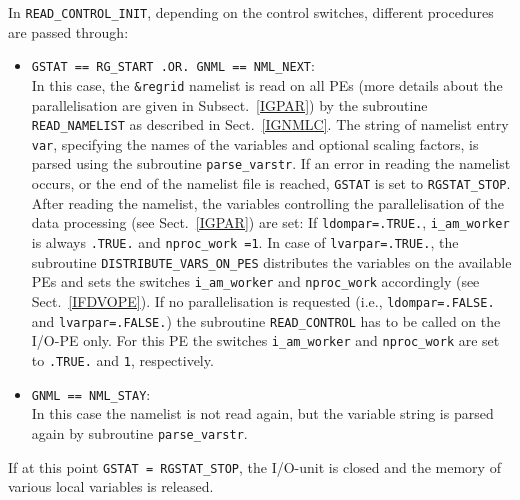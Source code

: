 \documentclass[11pt,twoside]{report}
\begin{document}
In \verb|READ_CONTROL_INIT|, depending on the control switches,
different procedures are passed through:
\begin{itemize}
\item  \verb|GSTAT == RG_START .OR. GNML == NML_NEXT|:\\
 In this case, the \verb|&regrid| namelist is read on all 
PEs (more details about the parallelisation are given in 
Subsect.~\ref{IGPAR}) by the subroutine
\verb|READ_NAMELIST| as described in Sect.~\ref{IGNMLC}. The string of
namelist entry
\verb|var|, specifying the names of the variables and optional scaling factors,
is parsed using the subroutine \verb|parse_varstr|.
If an error in reading the namelist occurs, or the end of the namelist file
is reached, \verb|GSTAT| is set to \verb|RGSTAT_STOP|.
After reading the namelist, the variables controlling the parallelisation of the
 data processing (see Sect.~\ref{IGPAR}) are set: 
If \verb|ldompar=.TRUE.|, \verb|i_am_worker| is always \verb|.TRUE.| and
\verb|nproc_work =1|. In case of \verb|lvarpar=.TRUE.|, the subroutine
\verb|DISTRIBUTE_VARS_ON_PES| distributes the variables on the available PEs
and sets the switches \verb|i_am_worker| and \verb|nproc_work| accordingly 
(see Sect.~\ref{IFDVOPE}). If no parallelisation is requested (i.e.,
\verb|ldompar=.FALSE.| and  \verb|lvarpar=.FALSE.|) the subroutine 
\verb|READ_CONTROL| has to be called on the I/O-PE only. For this PE the
 switches \verb|i_am_worker| and \verb|nproc_work| are set to  
\verb|.TRUE.| and \verb|1|, respectively.
\item \verb|GNML == NML_STAY|:\\
In this case the namelist is not read again, but the variable string is parsed
again by subroutine \verb|parse_varstr|.
\end{itemize}
If at this point \verb|GSTAT = RGSTAT_STOP|, the I/O-unit is closed and the 
memory of various local variables is released. 
\end{document}
